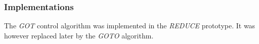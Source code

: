 \subsubsection{Implementations}
The \emph{GOT} control algorithm was implemented in the \emph{REDUCE} prototype. It was however replaced later by the \emph{GOTO} algorithm.


